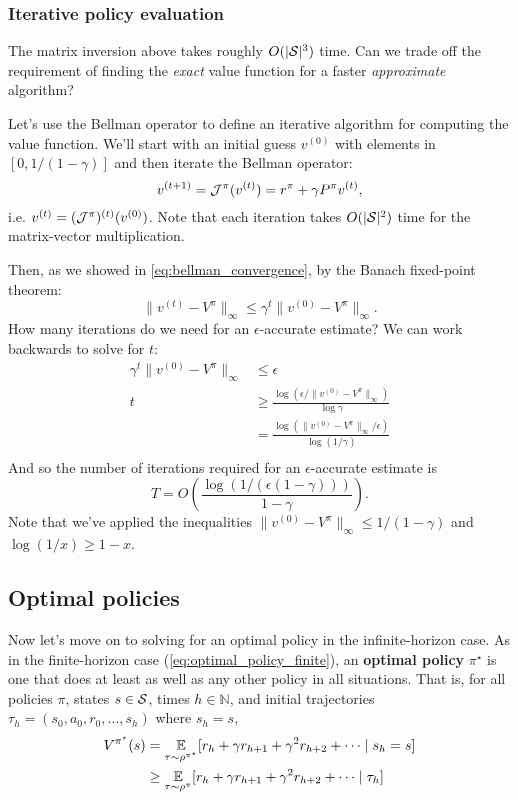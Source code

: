 \documentclass[../main/main]{subfiles}
\begin{document}
\subsubsection{Iterative policy evaluation}

The matrix inversion above takes roughly $O(|\S|^3)$ time. Can we trade off the requirement of finding the \emph{exact} value function for a faster \emph{approximate} algorithm?

Let's use the Bellman operator to define an iterative algorithm for computing the value function. We'll start with an initial guess $v^{(0)}$ with elements in $[0, 1/(1-\gamma)]$ and then iterate the Bellman operator:
\[
    v^{(t+1)} = \bop^{\pi}(v^{(t)}) = r^{\pi} + \gamma P^{\pi} v^{(t)},
\]
i.e. $v^{(t)} = (\bop^{\pi})^{(t)} (v^{(0)})$. Note that each iteration takes $O(|\S|^2)$ time for the matrix-vector multiplication.

Then, as we showed in \ref{eq:bellman_convergence}, by the Banach fixed-point theorem:
\[
    \|v^{(t)} - V^\pi \|_{\infty} \le \gamma^{t} \| v^{(0)} - V^\pi\|_{\infty}.
\]
How many iterations do we need for an $\epsilon$-accurate estimate? We can work backwards to solve for $t$:
\begin{align*}
    \gamma^t \|v^{(0)} - V^\pi\|_{\infty} &\le \epsilon \\
    t &\ge \frac{\log (\epsilon / \|v^{(0)} - V^\pi\|_{\infty})}{\log \gamma} \\
    &= \frac{\log (\|v^{(0)} - V^\pi\|_{\infty} / \epsilon)}{\log (1 / \gamma)} \\
\end{align*}
And so the number of iterations required for an $\epsilon$-accurate estimate is
\begin{equation}
    T = O\left( \frac{\log(1/(\epsilon (1-\gamma)))}{1-\gamma} \right). \label{eq:iterations_vi}
\end{equation}
Note that we've applied the inequalities $\|v^{(0)} - V^\pi\|_{\infty} \le 1/(1-\gamma)$ and $\log (1/x) \ge 1-x$.

\subsection{Optimal policies}

Now let's move on to solving for an optimal policy in the infinite-horizon case. As in the finite-horizon case (\ref{eq:optimal_policy_finite}), an \textbf{optimal policy} $\pi^\star$ is one that does at least as well as any other policy in all situations. That is, for all policies $\pi$, states $s \in \S$, times $h \in \mathbb{N}$, and initial trajectories $\tau_h = (s_0, a_0, r_0, \dots, s_h)$ where $s_h = s$,
\begin{equation}
    \begin{aligned}
        V^{\pi^\star}(s) &= \E_{\tau \sim \rho^{\pi^{\star}}}[r_h + \gamma r_{h+1} + \gamma^2 r_{h+2}  + \cdots \mid s_h = s] \\
        &\ge \E_{\tau \sim \rho^{\pi}}[r_h + \gamma r_{h+1} + \gamma^2 r_{h+2} + \cdots \mid \tau_h]
    \end{aligned}
    \label{eq:optimal_policy_infinite}
\end{equation}
\end{document}
